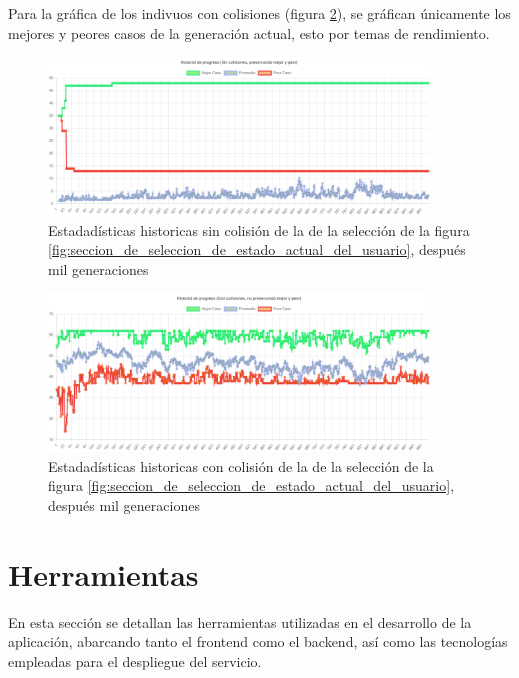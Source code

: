 Para la gráfica de los indivuos con colisiones (figura \ref{fig:statics_colision}), se gráfican únicamente los mejores y peores casos de la generación actual, esto por temas de rendimiento.

\begin{figure}[h]
    \centering
    \includegraphics[width=0.9\textwidth]{images/no-colision.png}
    \caption{Estadadísticas historicas sin colisión de la de la selección de la figura \ref{fig:seccion_de_seleccion_de_estado_actual_del_usuario}, después mil generaciones}
    \label{fig:statics_no_colision}
\end{figure}

\begin{figure}[h]
    \centering
    \includegraphics[width=0.9\textwidth]{images/with-colision.png}
    \caption{Estadadísticas historicas con colisión de la de la selección de la figura \ref{fig:seccion_de_seleccion_de_estado_actual_del_usuario}, después mil generaciones}
    \label{fig:statics_colision}
\end{figure}

\section{Herramientas} \label{herramientas}

En esta sección se detallan las herramientas utilizadas en el desarrollo de la aplicación, abarcando tanto el frontend como el backend, así como las tecnologías empleadas para el despliegue del servicio.

